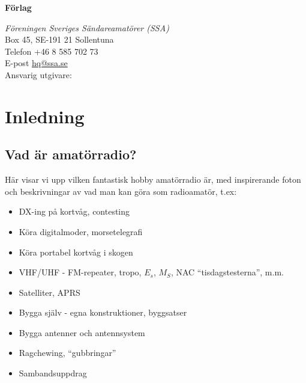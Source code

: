\documentclass[a4paper,twoside,openright]{book}
\begin{document}

\vfill

\noindent
\textbf{Förlag}

\noindent
\textit{Föreningen Sveriges Sändareamatörer (SSA)}\\
Box 45, SE-191 21 Sollentuna\\
Telefon +46 8 585 702 73\\
E-post \href{mailto:hq@ssa.se}{hq@ssa.se}\\[\baselineskip]

\noindent
Ansvarig utgivare:\\

\cleardoublepage
\pagestyle{fancy}


\tableofcontents

\setlength{\parindent}{0px}
\setlength{\parskip}{1ex plus 0.5ex minus 0.2ex}

\mainmatter

%





\part{Inledning}

\chapter{Vad är amatörradio?}
Här visar vi upp vilken fantastisk hobby amatörradio är, med
inspirerande foton och beskrivningar av vad man kan göra som
radioamatör, t.ex:
\begin{itemize}
\item DX-ing på kortvåg, contesting
\item Köra digitalmoder, morsetelegrafi
\item Köra portabel kortvåg i skogen
\item VHF/UHF - FM-repeater, tropo, $E_s$, $M_S$, NAC ``tisdagstesterna'', m.m.
\item Satelliter, APRS
\item Bygga själv - egna konstruktioner, byggsatser
\item Bygga antenner och antennsystem
\item Ragchewing, ``gubbringar''
\item Sambandsuppdrag
\end{itemize}
\end{document}
